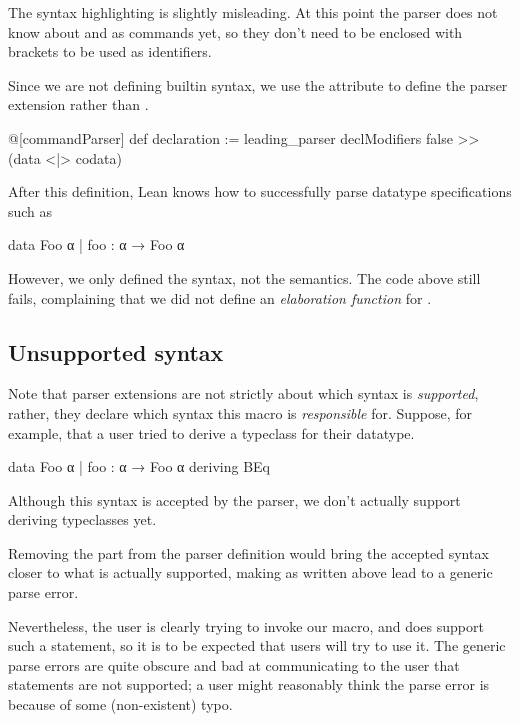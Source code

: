 \begin{remark}
    The syntax highlighting is slightly misleading. At this point the parser does not know about \data{} and \codata{} as commands yet, so they don't need to be enclosed with  brackets to be used as identifiers.
\end{remark}

Since we are not defining builtin syntax, we use the  attribute to define the parser extension
rather than .

\begin{leancode}
  @[commandParser] def declaration := leading_parser 
      declModifiers false >> (data <|> codata)
\end{leancode}


After this definition, Lean knows how to successfully parse datatype specifications such as
\begin{badleancode}
  data Foo α
    | foo : α → Foo α
\end{badleancode}

However, we only defined the syntax, not the semantics. 
The code above still fails, complaining that we did not define an \emph{elaboration function} for .


\subsection*{Unsupported syntax}%
\label{subsec:impl:unsupported_syntax}

Note that parser extensions are not strictly about which syntax is \emph{supported}, rather, they declare which syntax this macro is \emph{responsible} for.
Suppose, for example, that a user tried to derive a typeclass for their datatype.
\begin{badleancode}
  data Foo α
    | foo : α → Foo α
    deriving BEq
\end{badleancode}

Although this syntax is accepted by the \data{} parser, we don't actually support deriving typeclasses yet.

Removing the  part from the parser definition would bring the accepted syntax closer to what is actually supported, making  as written above lead to a generic parse error.

Nevertheless, the user is clearly trying to invoke our \data{} macro, and \inductive{} does support such a  statement, so it is to be expected that users will try to use it. The generic parse errors are quite obscure and bad at communicating to the user that  statements are not supported; a user might reasonably think the parse error is because of some (non-existent) typo.

